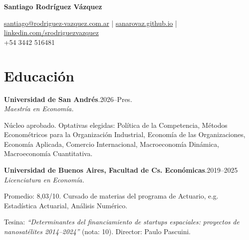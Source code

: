 \documentclass[11pt]{article}
\newcommand{\cvname}{Santiago Rodríguez Vázquez}
\newcommand{\entrydate}[1]{\hfill{\small{#1}}}
\begin{document}
\thispagestyle{firstpage}

{\LARGE\bfseries {\cvname}}

\href{mailto:santiago@rodriguez-vazquez.com.ar}{santiago@rodriguez-vazquez.com.ar} | \href{https://sanarovaz.github.io}{sanarovaz.github.io} | \href{https://linkedin.com/in/srodriguezvazquez}{linkedin.com/srodriguezvazquez}
\\
+54 3442 516481


\section{Educación}
\textbf{Universidad de San Andrés}.\entrydate{2026--Pres.}\\
\textit{Maestría en Economía.}
\begin{cvitems}
  \item Núcleo aprobado. Optativas elegidas: Política de la Competencia, Métodos Econométricos para la Organización Industrial, Economía de las Organizaciones, Economía Aplicada, Comercio Internacional, Macroeconomía Dinámica, Macroeconomía Cuantitativa.
\end{cvitems}

\smallskip
\textbf{Universidad de Buenos Aires, Facultad de Cs. Económicas}.\entrydate{2019--2025}\\
\textit{Licenciatura en Economía.}
\begin{cvitems}
  \item Promedio: 8,03/10. Cursado de materias del programa de Actuario, e.g. Estadística Actuarial, Análisis Numérico.
  \item Tesina: \emph{``Determinantes del financiamiento de startups espaciales: proyectos de nanosatélites 2014--2024''} (nota: 10). Director: Paulo Pascuini.
\end{cvitems}

\end{document}
